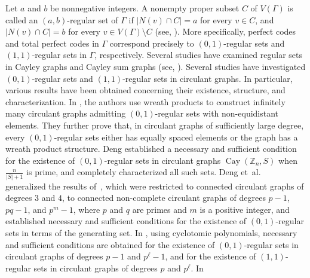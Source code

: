 \documentclass[12pt]{article}
\begin{document}
Let $a$ and $b$ be nonnegative integers. A nonempty proper subset $C$ of $V(\Gamma)$ is called an $(a,b)$-regular set of $\Gamma$ if $\lvert N(v)\cap C\rvert=a$ for every $v\in C$, and $\lvert N(v)\cap C\rvert=b$ for every $v\in V(\Gamma)\setminus C$ (see, \cite{Cardoso}). More specifically, perfect codes and total perfect codes in $\Gamma$ correspond precisely to $(0,1)$-regular sets and $(1,1)$-regular sets in $\Gamma$, respectively. Several studies have examined regular sets in Cayley graphs and Cayley sum graphs (see, \cite{KAK,SKA,WXS,WXSJ, WXSZ,ZY, ZZ}). Several studies have investigated $(0,1)$-regular sets and $(1,1)$-regular sets in circulant graphs. In particular, various results have been obtained concerning their existence, structure, and characterization. In \cite{KM}, the authors use wreath products to construct infinitely many circulant graphs admitting $(0,1)$-regular sets with non-equidistant elements. They further prove that, in circulant graphs of sufficiently large degree, every $(0,1)$-regular sets either has equally spaced elements or the graph has a wreath product structure. Deng \cite{Deng} established a necessary and sufficient condition for the existence of $(0,1)$-regular sets in circulant graphs $\operatorname{Cay}(\mathbb{Z}_n,S)$ when $\frac{n}{|S|+1}$ is prime, and completely characterized all such sets. Deng et~al.~\cite{dengg} generalized the results of~\cite{OPR}, which were restricted to connected circulant graphs of degrees $3$ and $4$, to connected non-complete circulant graphs of degrees $p-1$, $pq-1$, and $p^m-1$, where $p$ and $q$ are primes and $m$ is a positive integer, and established necessary and sufficient conditions for the existence of $(0,1)$-regular sets in terms of the generating set. In \cite{rWXSJ}, using cyclotomic polynomials, necessary and sufficient conditions are obtained for the existence of $(0,1)$-regular sets in circulant graphs of degrees $p-1$ and $p^\ell-1$, and for the existence of $(1,1)$-regular sets in circulant graphs of degrees $p$ and $p^\ell$. In~\cite{zawxj}
\end{document}
